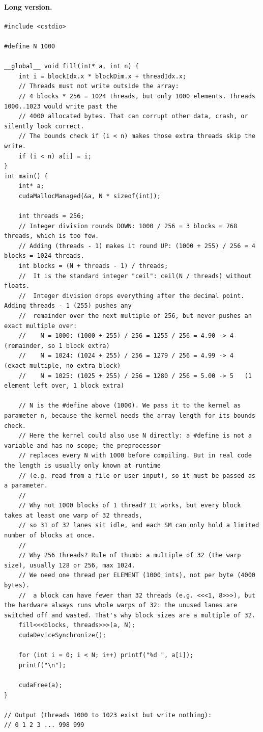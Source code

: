 \documentclass[main.tex]{subfiles}
\begin{document}
\paragraph{Long version.}
\begin{lstlisting}[language=CUDA]
#include <cstdio>

#define N 1000

__global__ void fill(int* a, int n) {
    int i = blockIdx.x * blockDim.x + threadIdx.x;
    // Threads must not write outside the array:
    // 4 blocks * 256 = 1024 threads, but only 1000 elements. Threads 1000..1023 would write past the
    // 4000 allocated bytes. That can corrupt other data, crash, or silently look correct.
    // The bounds check if (i < n) makes those extra threads skip the write.
    if (i < n) a[i] = i;
}
int main() {
    int* a;
    cudaMallocManaged(&a, N * sizeof(int));

    int threads = 256;
    // Integer division rounds DOWN: 1000 / 256 = 3 blocks = 768 threads, which is too few.
    // Adding (threads - 1) makes it round UP: (1000 + 255) / 256 = 4 blocks = 1024 threads.
    int blocks = (N + threads - 1) / threads;
    //  It is the standard integer "ceil": ceil(N / threads) without floats.
    //  Integer division drops everything after the decimal point. Adding threads - 1 (255) pushes any
    //  remainder over the next multiple of 256, but never pushes an exact multiple over:
    //    N = 1000: (1000 + 255) / 256 = 1255 / 256 = 4.90 -> 4   (remainder, so 1 block extra)
    //    N = 1024: (1024 + 255) / 256 = 1279 / 256 = 4.99 -> 4   (exact multiple, no extra block)
    //    N = 1025: (1025 + 255) / 256 = 1280 / 256 = 5.00 -> 5   (1 element left over, 1 block extra)

    // N is the #define above (1000). We pass it to the kernel as parameter n, because the kernel needs the array length for its bounds check.
    // Here the kernel could also use N directly: a #define is not a variable and has no scope; the preprocessor
    // replaces every N with 1000 before compiling. But in real code the length is usually only known at runtime
    // (e.g. read from a file or user input), so it must be passed as a parameter.
    //
    // Why not 1000 blocks of 1 thread? It works, but every block takes at least one warp of 32 threads,
    // so 31 of 32 lanes sit idle, and each SM can only hold a limited number of blocks at once.
    //
    // Why 256 threads? Rule of thumb: a multiple of 32 (the warp size), usually 128 or 256, max 1024.
    // We need one thread per ELEMENT (1000 ints), not per byte (4000 bytes).
    //  a block can have fewer than 32 threads (e.g. <<<1, 8>>>), but the hardware always runs whole warps of 32: the unused lanes are switched off and wasted. That's why block sizes are a multiple of 32.
    fill<<<blocks, threads>>>(a, N);
    cudaDeviceSynchronize();

    for (int i = 0; i < N; i++) printf("%d ", a[i]);
    printf("\n");

    cudaFree(a);
}

// Output (threads 1000 to 1023 exist but write nothing):
// 0 1 2 3 ... 998 999
\end{lstlisting}
\end{document}
